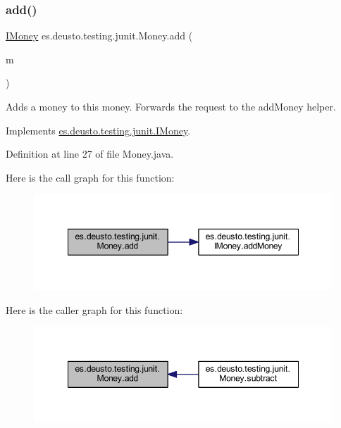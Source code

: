 \subsubsection{\texorpdfstring{add()}{add()}}
{\footnotesize\ttfamily \mbox{\hyperlink{interfacees_1_1deusto_1_1testing_1_1junit_1_1_i_money}{I\+Money}} es.\+deusto.\+testing.\+junit.\+Money.\+add (\begin{DoxyParamCaption}\item[{\mbox{\hyperlink{interfacees_1_1deusto_1_1testing_1_1junit_1_1_i_money}{I\+Money}}}]{m }\end{DoxyParamCaption})}

Adds a money to this money. Forwards the request to the add\+Money helper. 

Implements \mbox{\hyperlink{interfacees_1_1deusto_1_1testing_1_1junit_1_1_i_money_a7f3ac1ced239e64294706155c569b8de}{es.\+deusto.\+testing.\+junit.\+I\+Money}}.



Definition at line 27 of file Money.\+java.

Here is the call graph for this function\+:\nopagebreak
\begin{figure}[H]
\begin{center}
\leavevmode
\includegraphics[width=348pt]{classes_1_1deusto_1_1testing_1_1junit_1_1_money_a6a3d64861c49dee89ffd0ed0c576045d_cgraph}
\end{center}
\end{figure}
Here is the caller graph for this function\+:\nopagebreak
\begin{figure}[H]
\begin{center}
\leavevmode
\includegraphics[width=348pt]{classes_1_1deusto_1_1testing_1_1junit_1_1_money_a6a3d64861c49dee89ffd0ed0c576045d_icgraph}
\end{center}
\end{figure}
\mbox{\label{classes_1_1deusto_1_1testing_1_1junit_1_1_money_a223a447d5daf23b5e9cc0f551b72e328}} 
